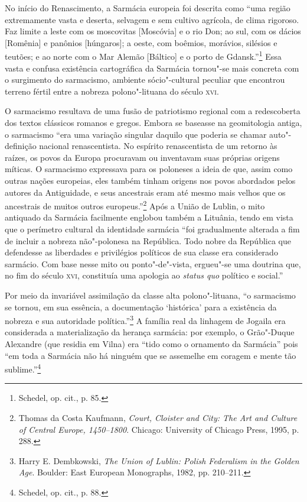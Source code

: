 No início do Renascimento, a Sarmácia europeia foi descrita como ``uma
região extremamente vasta e deserta, selvagem e sem cultivo agrícola, de
clima rigoroso. Faz limite a leste com os moscovitas {[}Moscóvia{]} e o
rio Don; ao sul, com os dácios {[}Romênia{]} e panônios {[}húngaros{]};
a oeste, com boêmios, morávios, silésios e teutões; e ao norte com o Mar
Alemão {[}Báltico{]} e o porto de Gdansk.''\footnote{Schedel, op. cit., p. 85.} Essa vasta e confusa existência cartográfica da Sarmácia tornou"-se mais concreta com o surgimento do sarmacismo, ambiente
sócio"-cultural peculiar que encontrou terreno fértil entre a nobreza
polono"-lituana do século \textsc{xvi}.

O sarmacismo resultava de uma fusão de patriotismo regional com a
redescoberta dos textos clássicos romanos e gregos. Embora se baseasse
na geomitologia antiga, o sarmacismo ``era uma variação singular daquilo
que poderia se chamar auto"-definição nacional renascentista. No espírito
renascentista de um retorno às raízes, os povos da Europa procuravam ou
inventavam suas próprias origens míticas. O sarmacismo expressava para
os poloneses a ideia de que, assim como outras nações europeias, eles
também tinham origens nos povos abordados pelos autores da Antiguidade,
e seus ancestrais eram até mesmo mais velhos que os ancestrais de muitos
outros europeus.''\footnote{Thomas da Costa Kaufmann, \textit{Court, Cloister and City: The Art and Culture of Central Europe, 1450--1800}. Chicago: University of Chicago Press, 1995, p. 288.} Após a União de Lublin, o mito antiquado da Sarmácia facilmente englobou também a
Lituânia, tendo em vista que o perímetro cultural da identidade sarmácia ``foi gradualmente alterada a fim de incluir a nobreza não"-polonesa na
República. Todo nobre da República que defendesse as liberdades e
privilégios políticos de sua classe era considerado sarmácio. Com base
nesse mito ou ponto"-de"-vista, ergueu"-se uma doutrina que, no fim do
século \textsc{xvi}, constituía uma apologia ao \textit{status quo} político e
social.''

Por meio da invariável assimilação da classe alta
polono"-lituana, ``o sarmacismo se tornou, em sua essência, a
documentação `histórica' para a existência da nobreza e sua autoridade
política.''\footnote{Harry E. Dembkowski, \textit{The Union of Lublin: Polish Federalism in the Golden Age}. Boulder: East European Monographs, 1982, pp. 210--211.} A família real da linhagem de Jogaila era considerada a materialização da herança sarmácia: por exemplo, o
Grão"-Duque Alexandre (que residia em Vilna) era ``tido como o ornamento
da Sarmácia'' pois ``em toda a Sarmácia não há ninguém que se assemelhe
em coragem e mente tão sublime.''\footnote{Schedel, op. cit., p. 88.}


